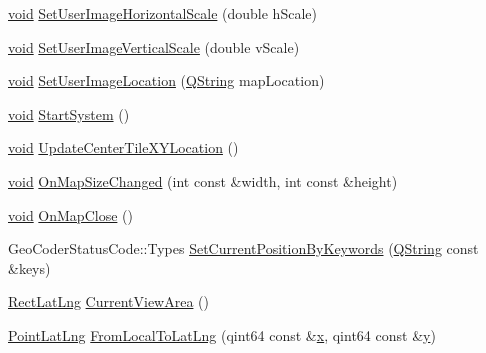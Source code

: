 \begin{DoxyCompactItemize}
\hyperlink{group___u_a_v_objects_plugin_ga444cf2ff3f0ecbe028adce838d373f5c}{void} \hyperlink{group___o_p_map_widget_ga597dd716558e9c45baa91de591f4ce07}{\-Set\-User\-Image\-Horizontal\-Scale} (double h\-Scale)
\item 
\hyperlink{group___u_a_v_objects_plugin_ga444cf2ff3f0ecbe028adce838d373f5c}{void} \hyperlink{group___o_p_map_widget_gae296cd09fb96cfeadbe202f9cba7e1fd}{\-Set\-User\-Image\-Vertical\-Scale} (double v\-Scale)
\item 
\hyperlink{group___u_a_v_objects_plugin_ga444cf2ff3f0ecbe028adce838d373f5c}{void} \hyperlink{group___o_p_map_widget_gafe136669e790fac1607a72f7bfca9510}{\-Set\-User\-Image\-Location} (\hyperlink{group___u_a_v_objects_plugin_gab9d252f49c333c94a72f97ce3105a32d}{\-Q\-String} map\-Location)
\item 
\hyperlink{group___u_a_v_objects_plugin_ga444cf2ff3f0ecbe028adce838d373f5c}{void} \hyperlink{group___o_p_map_widget_gacc5971a73e9ba3ed87d97bf76e2c2e51}{\-Start\-System} ()
\item 
\hyperlink{group___u_a_v_objects_plugin_ga444cf2ff3f0ecbe028adce838d373f5c}{void} \hyperlink{group___o_p_map_widget_ga1c516d5c141339ebb623bd521e20edb6}{\-Update\-Center\-Tile\-X\-Y\-Location} ()
\item 
\hyperlink{group___u_a_v_objects_plugin_ga444cf2ff3f0ecbe028adce838d373f5c}{void} \hyperlink{group___o_p_map_widget_ga32b946b66a00213f725727696df9d9b4}{\-On\-Map\-Size\-Changed} (int const \&width, int const \&height)
\item 
\hyperlink{group___u_a_v_objects_plugin_ga444cf2ff3f0ecbe028adce838d373f5c}{void} \hyperlink{group___o_p_map_widget_ga10820264fc94dee4c279f60f6ed02309}{\-On\-Map\-Close} ()
\item 
\-Geo\-Coder\-Status\-Code\-::\-Types \hyperlink{group___o_p_map_widget_ga6fbdb5c07fae2a4400184e0c621ad750}{\-Set\-Current\-Position\-By\-Keywords} (\hyperlink{group___u_a_v_objects_plugin_gab9d252f49c333c94a72f97ce3105a32d}{\-Q\-String} const \&keys)
\item 
\hyperlink{structinternals_1_1_rect_lat_lng}{\-Rect\-Lat\-Lng} \hyperlink{group___o_p_map_widget_ga228af41d307f46e0d759a52f0305d39a}{\-Current\-View\-Area} ()
\item 
\hyperlink{structinternals_1_1_point_lat_lng}{\-Point\-Lat\-Lng} \hyperlink{group___o_p_map_widget_gad6344ac56cefc8976c5bdf521b337a2f}{\-From\-Local\-To\-Lat\-Lng} (qint64 const \&\hyperlink{_o_p_plots_8m_a9336ebf25087d91c818ee6e9ec29f8c1}{x}, qint64 const \&\hyperlink{_o_p_plots_8m_a2fb1c5cf58867b5bbc9a1b145a86f3a0}{y})

\end{DoxyCompactItemize}
